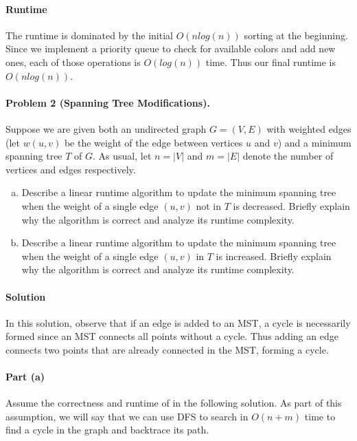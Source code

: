 \documentclass[11pt]{article}
\begin{document}
\paragraph{Runtime}
The runtime is dominated by the initial $O(nlog(n))$ sorting at the beginning.
Since we implement a priority queue to check for available colors and add new
ones, each of those operations is $O(log(n))$ time. Thus our final runtime is
$\boxed{O(nlog(n))}$.

\newpage
\paragraph{Problem 2 (Spanning Tree Modifications).} Suppose we are given both an undirected graph $G = (V,E)$ with weighted edges (let $w(u,v)$ be the weight of the edge between vertices $u$ and $v$) and a minimum spanning tree $T$ of $G$. As usual, let $n = |V|$ and $m = |E|$ denote the number of vertices and edges respectively.

\begin{enumerate}[(a)]
    \item Describe a linear runtime algorithm to update the minimum spanning tree when the weight of a single edge $(u,v)$ not in $T$ is decreased. Briefly explain why the algorithm is correct and analyze its runtime complexity.
    \item Describe a linear runtime algorithm to update the minimum spanning tree when the weight of a single edge $(u,v)$ in $T$ is increased. Briefly explain why the algorithm is correct and analyze its runtime complexity.
\end{enumerate}

\paragraph{Solution} 
In this solution, observe that if an edge is added to an MST, a cycle is 
necessarily formed since an MST connects all points without a cycle. Thus adding
an edge connects two points that are already connected in the MST, forming a
cycle. 

\paragraph{Part (a)}
Assume the correctness and runtime of  in the following solution.
As part of this assumption, we will say that we can use DFS to search in
$O(n+m)$ time to find a cycle in the graph and backtrace its path.
\end{document}
